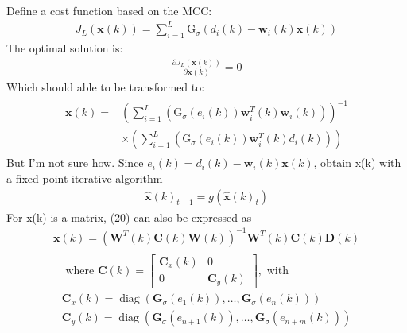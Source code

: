\documentclass[dvipdfmx]{jsarticle}
\begin{document}
Define a cost function based on the MCC:
\begin{equation}\label{Func.}\begin{aligned}
    J_{L}(\mathbf{x}(k))=\sum_{i=1}^{L} \mathrm{G}_{\sigma}\left(d_{i}(k)-\mathbf{w}_{i}(k) \mathbf{x}(k)\right)
\end{aligned}\end{equation}
The optimal solution is:
\begin{equation}\label{Func.}\begin{aligned}
    \frac{\partial J_{L}(\mathbf{x}(k))}{\partial \mathbf{x}(k)}=0
\end{aligned}\end{equation}
Which should able to be transformed to:
\begin{equation}\label{Func.}\begin{aligned}
    \begin{aligned}
        \mathbf{x}(k)=&\left(\sum_{i=1}^{L}\left(\mathrm{G}_{\sigma}\left(e_{i}(k)\right) \mathbf{w}_{i}^{T}(k) \mathbf{w}_{i}(k)\right)\right)^{-1} \\
        & \times\left(\sum_{i=1}^{L}\left(\mathrm{G}_{\sigma}\left(e_{i}(k)\right) \mathbf{w}_{i}^{T}(k) d_{i}(k)\right)\right)
        \end{aligned}
\end{aligned}\end{equation}
But I'm not sure how.
Since $e_{i}(k)=d_{i}(k)-\mathbf{w}_{i}(k) \mathbf{x}(k)$, obtain x(k) with
a fixed-point iterative algorithm
\begin{equation}\label{Func.}\begin{aligned}
    \widehat{\mathbf{x}}(k)_{t+1}=g\left(\widehat{\mathbf{x}}(k)_{t}\right)
\end{aligned}\end{equation}
For x(k) is a matrix, (20) can also be expressed as
\begin{equation}\label{Func.}\begin{aligned}
    \mathbf{x}(k)=\left(\mathbf{W}^{T}(k) \mathbf{C}(k) \mathbf{W}(k)\right)^{-1} \mathbf{W}^{T}(k) \mathbf{C}(k) \mathbf{D}(k)
\end{aligned}\end{equation}
\begin{equation}\label{Func.}\begin{aligned}
    \begin{array}{l}
        \text { where } \mathbf{C}(k)=\left[\begin{array}{cc}
        \mathbf{C}_{x}(k) & 0 \\
        0 & \mathbf{C}_{y}(k)
        \end{array}\right], \text { with } \\
        \mathbf{C}_{x}(k)=\operatorname{diag}\left(\mathbf{G}_{\sigma}\left(e_{1}(k)\right), \ldots, \mathbf{G}_{\sigma}\left(e_{n}(k)\right)\right) \\
        \mathbf{C}_{y}(k)=\operatorname{diag}\left(\mathbf{G}_{\sigma}\left(e_{n+1}(k)\right), \ldots, \mathbf{G}_{\sigma}\left(e_{n+m}(k)\right)\right)
        \end{array}
\end{aligned}\end{equation}
\end{document}
